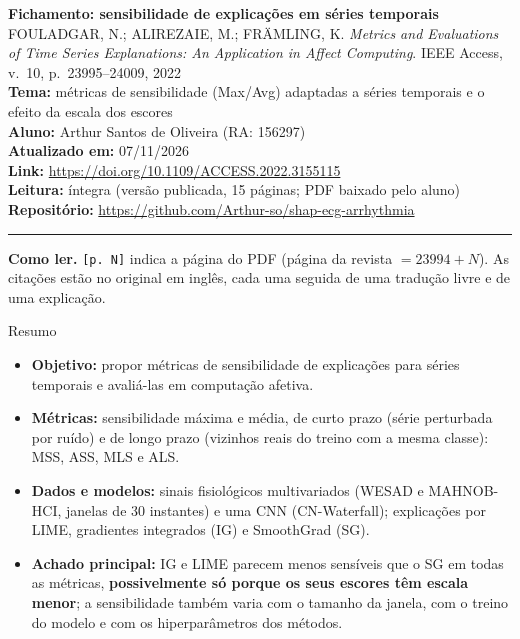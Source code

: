 \documentclass[11pt,a4paper]{article}
\begin{document}
\begin{center}
    {\LARGE \textbf{Fichamento: sensibilidade de explicações em séries temporais}} \\[0.35em]
    {\large FOULADGAR, N.; ALIREZAIE, M.; FRÄMLING, K. \textit{Metrics and Evaluations of Time Series Explanations: An Application in Affect Computing}. IEEE Access, v.~10, p.~23995--24009, 2022} \\[0.3em]
    \textbf{Tema:} métricas de sensibilidade (Max/Avg) adaptadas a séries temporais e o efeito da escala dos escores \\[0.2em]
    \textbf{Aluno:} Arthur Santos de Oliveira (RA: 156297) \\[0.2em]
    \textbf{Atualizado em:} 07/11/2026 \\[0.2em]
    \textbf{Link:} \url{https://doi.org/10.1109/ACCESS.2022.3155115} \\[0.2em]
    \textbf{Leitura:} íntegra (versão publicada, 15 páginas; PDF baixado pelo aluno) \\[0.2em]
    \textbf{Repositório:} \url{https://github.com/Arthur-so/shap-ecg-arrhythmia}
\end{center}
\vspace{-0.5em}
\hrule
\vspace{0.8em}

\textbf{Como ler.} \texttt{[p. N]} indica a página do PDF (página da revista $= 23994 + N$). As citações estão no original em inglês, cada uma seguida de uma tradução livre e de uma explicação.

\begin{infobox}[note]{Resumo}
\begin{itemize}
\item \textbf{Objetivo:} propor métricas de sensibilidade de explicações para séries temporais e avaliá-las em computação afetiva.
\item \textbf{Métricas:} sensibilidade máxima e média, de curto prazo (série perturbada por ruído) e de longo prazo (vizinhos reais do treino com a mesma classe): MSS, ASS, MLS e ALS.
\item \textbf{Dados e modelos:} sinais fisiológicos multivariados (WESAD e MAHNOB-HCI, janelas de 30 instantes) e uma CNN (CN-Waterfall); explicações por LIME, gradientes integrados (IG) e SmoothGrad (SG).
\item \textbf{Achado principal:} IG e LIME parecem menos sensíveis que o SG em todas as métricas, \textbf{possivelmente só porque os seus escores têm escala menor}; a sensibilidade também varia com o tamanho da janela, com o treino do modelo e com os hiperparâmetros dos métodos.
\end{itemize}
\end{infobox}
\end{document}
